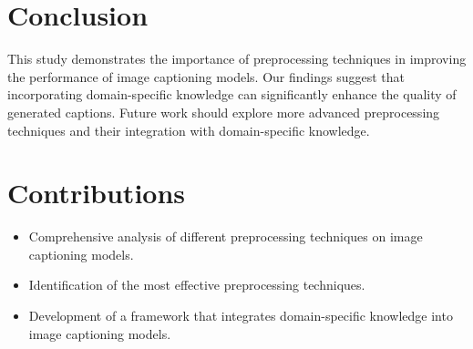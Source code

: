 \documentclass{article}
\begin{document}
\section{Conclusion}
This study demonstrates the importance of preprocessing techniques in improving the performance of image captioning models. Our findings suggest that incorporating domain-specific knowledge can significantly enhance the quality of generated captions. Future work should explore more advanced preprocessing techniques and their integration with domain-specific knowledge.

\section{Contributions}
\begin{itemize}
    \item Comprehensive analysis of different preprocessing techniques on image captioning models.
    \item Identification of the most effective preprocessing techniques.
    \item Development of a framework that integrates domain-specific knowledge into image captioning models.
\end{itemize}
\end{document}
